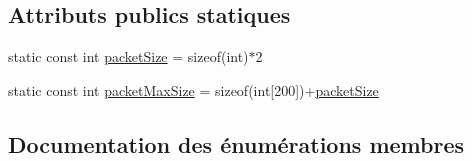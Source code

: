 \subsection*{Attributs publics statiques}
\begin{DoxyCompactItemize}
\item 
static const int \hyperlink{classPacket_a4d3ec46364b14d6f59e550920ec9a78a}{packet\+Size} = sizeof(int)$\ast$2
\item 
static const int \hyperlink{classPacket_ab2ef9ab81c25a39ca3a09b954a5765a2}{packet\+Max\+Size} = sizeof(int\mbox{[}200\mbox{]})+\hyperlink{classPacket_a4d3ec46364b14d6f59e550920ec9a78a}{packet\+Size}
\end{DoxyCompactItemize}


\subsection{Documentation des énumérations membres}
\hypertarget{classPacket_ae91c1d355e4c8f0bef5f893747473661}{}
